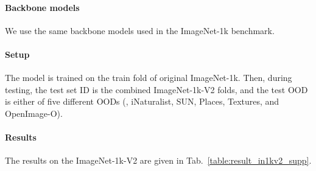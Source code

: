 \documentclass[10pt,twocolumn,letterpaper]{article}
\begin{document}
\paragraph{Backbone models}
We use the same backbone models used in the ImageNet-1k benchmark.

\paragraph{Setup}
The model is trained on the train fold of original ImageNet-1k. Then, during testing, the test set ID is the combined ImageNet-1k-V2 folds, and the test OOD is either of five different OODs (\ie, iNaturalist, SUN, Places, Textures, and OpenImage-O).

\paragraph{Results}
The results on the ImageNet-1k-V2 are given in Tab.~\ref{table:result_in1kv2_supp}.
\end{document}
